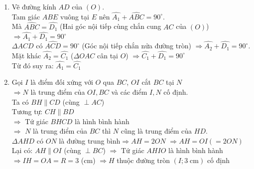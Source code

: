 \begin{bt}
{\begin{enumerate}
			\item Vẽ đường kính $AD$ của $(O)$.\\
			Tam giác $ABE$ vuông tại $E$ nên $\widehat{A_1}+\widehat{ABC}=90^\circ$.\\
			Mà $\widehat{ABC}=\widehat{D_1}$ (Hai góc nội tiếp cùng chắn cung $AC$ của $(O)$)
			$\Rightarrow \widehat{A_1}+\widehat{D_1}=90^\circ$\\
			$\Delta ACD$ có $\widehat{ACD}=90^\circ$ (Góc nội tiếp chắn nửa đường tròn) $\Rightarrow \widehat{A_2}+\widehat{D_1}=90^\circ$.\\
			Mặt khác $\widehat{A_2}=\widehat{C_1}$ ($\Delta OAC$ cân tại $O$) $\Rightarrow \widehat{C_1}+\widehat{D_1}=90^\circ$\\
			Từ đó suy ra: $\widehat{A_1}=\widehat{C_1}$
			\item Gọi $I$ là điểm đối xứng với $O$ qua $BC$, $OI$ cắt $BC$ tại $N$\\
			$\Rightarrow N$ là trung điểm của $OI, BC$ và các điểm $I,N$ cố định.\\
			Ta có $BH\parallel CD$ (cùng $\perp AC$)\\
			Tương tự: $CH\parallel BD$\\
			$\Rightarrow $ Tứ giác $BHCD$ là hình bình hành\\
			$\Rightarrow $ $N$ là trung điểm của $BC$ thì $N$ cũng là trung điểm của $HD$.\\
			$\Delta AHD$ có $ON$ là đường trung bình$\Rightarrow AH=2ON$ $\Rightarrow AH=OI\left(=2ON\right)$\\
			Lại có: $AH\parallel OI$ (cùng $\perp BC$)
			$\Rightarrow $ Tứ giác $AHIO$ là hình bình hành\\
			$\Rightarrow IH=OA=R=3$ (cm)
			$\Rightarrow H$ thuộc đường tròn $\left(I;3\;\text{cm}\right)$ cố định  
		\end{enumerate}
	}
\end{bt}

